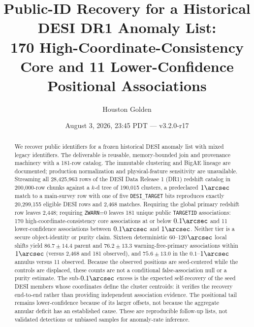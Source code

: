 \documentclass[twocolumn,linenumbers]{aastex702}
\newcommand{\paperVersion}{v3.2.0-r17}
\newcommand{\paperTimestamp}{August 3, 2026, 23:45 PDT}
\begin{document}
\title{Public-ID Recovery for a Historical DESI DR1 Anomaly List:\\
170 High-Coordinate-Consistency Core and 11 Lower-Confidence Positional Associations}

\author{Houston Golden}
\date{\paperTimestamp{} --- \paperVersion}

\begin{abstract}
We recover public identifiers for a frozen historical DESI anomaly list with mixed legacy
identifiers.  The deliverable is reusable, memory-bounded join and provenance machinery with a
181-row catalog.  The immutable clustering and BigAE lineage are documented; production
normalization and physical-feature sensitivity are unavailable.  Streaming all 28,425,963
rows of the DESI Data Release 1 (DR1) redshift catalog in 200,000-row chunks against a $k$-d
tree of 190,015 clusters, a predeclared $1\arcsec$ match to a main-survey row with one of five
\texttt{DESI\_TARGET} bits reproduces exactly 20,299,155 eligible DESI rows and 2,468 matches.
Requiring the global primary redshift row leaves 2,448; requiring \texttt{ZWARN}=0 leaves 181
unique public \texttt{TARGETID} associations: 170 high-coordinate-consistency core associations at or below
$0.1\arcsec$ and 11 lower-confidence associations between $0.1\arcsec$ and $1\arcsec$.  Neither
tier is a secure object-identity or purity claim.  Sixteen deterministic 60--120$\arcsec$ local
shifts yield $86.7\pm14.4$ parent and $76.2\pm13.3$ warning-free-primary associations within
$1\arcsec$ (versus 2,468 and 181 observed), and $75.6\pm13.0$ in the $0.1$--$1\arcsec$ annulus
versus 11 observed.  Because the observed positions are seed-centered while the controls are
displaced, these counts are not a conditional false-association null or a purity estimate.  The
sub-$0.1\arcsec$ excess is the expected self-recovery of the seed DESI members whose coordinates
define the cluster centroids: it verifies the recovery end-to-end rather than providing
independent association evidence.  The positional tail remains lower-confidence because of its
larger offsets, not because the aggregate annular deficit has an established cause.  These are
reproducible follow-up lists, not validated detections or
unbiased samples for anomaly-rate inference.
\end{abstract}
\end{document}

